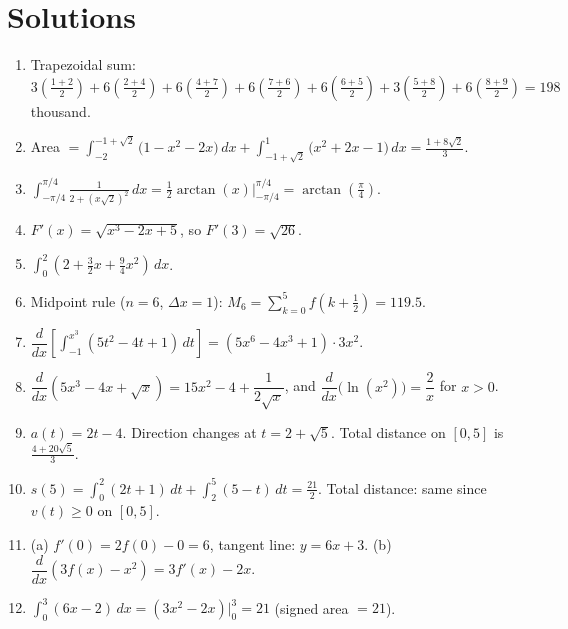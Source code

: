 \documentclass[12pt]{article}
\begin{document}
\section*{Solutions}
\begin{enumerate}[leftmargin=*, itemsep=0.8em, topsep=0.6em]
  \item Trapezoidal sum: $3\!\left(\frac{1+2}{2}\right)+6\!\left(\frac{2+4}{2}\right)+6\!\left(\frac{4+7}{2}\right)+6\!\left(\frac{7+6}{2}\right)+6\!\left(\frac{6+5}{2}\right)+3\!\left(\frac{5+8}{2}\right)+6\!\left(\frac{8+9}{2}\right)=198$ thousand.
  \item Area $=\displaystyle \int_{-2}^{-1+\sqrt{2}}\!\!\!\!\big(1-x^2-2x\big)\,dx+\int_{-1+\sqrt{2}}^{1}\!\!\!\!\big(x^2+2x-1\big)\,dx=\frac{1+8\sqrt{2}}{3}$.
  \item $\displaystyle \int_{-\pi/4}^{\pi/4}\frac{1}{2+(x\sqrt{2})^2}\,dx=\frac{1}{2}\arctan(x)\Big|_{-\pi/4}^{\pi/4}=\arctan\!\left(\frac{\pi}{4}\right)$.
  \item $F'(x)=\sqrt{x^3-2x+5}$, so $F'(3)=\sqrt{26}$.
  \item $\displaystyle \int_{0}^{2}\left(2+\frac{3}{2}x+\frac{9}{4}x^2\right)\,dx$.
  \item Midpoint rule ($n=6$, $\Delta x=1$): $M_6=\sum_{k=0}^{5} f\!\left(k+\tfrac{1}{2}\right)=119.5$.
  \item $\dfrac{d}{dx}\left[\int_{-1}^{x^3}(5t^2-4t+1)\,dt\right]=(5x^6-4x^3+1)\cdot 3x^2$.
  \item $\dfrac{d}{dx}(5x^3-4x+\sqrt{x})=15x^2-4+\dfrac{1}{2\sqrt{x}}$, and $\dfrac{d}{dx}\big(\ln(x^2)\big)=\dfrac{2}{x}$ for $x>0$.
  \item $a(t)=2t-4$. Direction changes at $t=2+\sqrt{5}$. Total distance on $[0,5]$ is $\frac{4+20\sqrt{5}}{3}$.
  \item $s(5)=\int_0^2(2t+1)\,dt+\int_2^5(5-t)\,dt=\frac{21}{2}$. Total distance: same since $v(t)\ge0$ on $[0,5]$.
  \item (a) $f'(0)=2f(0)-0=6$, tangent line: $y=6x+3$. (b) $\dfrac{d}{dx}(3f(x)-x^2)=3f'(x)-2x$.
  \item $\displaystyle \int_0^3(6x-2)\,dx=\left(3x^2-2x\right)\Big|_0^3=21$ (signed area $=21$).
\end{enumerate}
\end{document}
